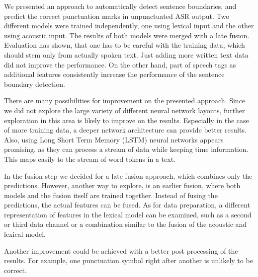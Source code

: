 We presented an approach to automatically detect sentence boundaries, and predict the correct punctuation marks in unpunctuated ASR output.
Two different models were trained independently, one using lexical input and the other using acoustic input.
The results of both models were merged with a late fusion.
Evaluation has shown, that one has to be careful with the training data, which should stem only from actually spoken text.
Just adding more written text data did not improve the performance.
On the other hand, part of speech tags as additional features consistently increase the performance of the sentence boundary detection.

There are many possibilities for improvement on the presented approach.
Since we did not explore the large variety of different neural network layouts, further exploration in this area is likely to improve on the results.
Especially in the case of more training data, a deeper network architecture can provide better results.
Also, using Long Short Term Memory (LSTM) neural networks appears promising, as they can process a stream of data while keeping time information.
This maps easily to the stream of word tokens in a text.

In the fusion step we decided for a late fusion approach, which combines only the predictions.
However, another way to explore, is an earlier fusion, where both models and the fusion itself are trained together.
Instead of fusing the predictions, the actual features can be fused.
As for data preparation, a different representation of features in the lexical model can be examined, such as a second or third data channel or a combination similar to the fusion of the acoustic and lexical model.

Another improvement could be achieved with a better post processing of the results.
For example, one punctuation symbol right after another is unlikely to be correct.